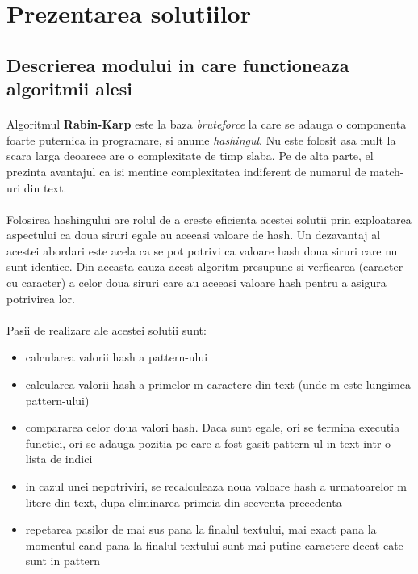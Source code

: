 \documentclass[runningheads]{llncs}
\begin{document}
\section{Prezentarea solutiilor}
\subsection{Descrierea modului in care functioneaza algoritmii alesi}
\paragraph{} Algoritmul \textbf{Rabin-Karp} este la baza \textit{bruteforce} la care se adauga o componenta foarte puternica in programare, si anume \textit{hashingul}. Nu este folosit asa mult la scara larga deoarece are o complexitate de timp slaba. Pe de alta parte, el prezinta avantajul ca isi mentine complexitatea indiferent de numarul de match-uri din text.
\paragraph{} Folosirea hashingului are rolul de a creste eficienta acestei solutii prin exploatarea aspectului ca doua siruri egale au aceeasi valoare de hash. Un dezavantaj al acestei abordari este acela ca se pot potrivi ca valoare hash doua siruri care nu sunt identice. Din aceasta cauza acest algoritm presupune si verficarea (caracter cu caracter) a celor doua siruri care au aceeasi valoare hash pentru a asigura potrivirea lor.
\paragraph{} Pasii de realizare ale acestei solutii sunt: \\
\begin{itemize}
\item calcularea valorii hash a pattern-ului
\item calcularea valorii hash a primelor m caractere din text (unde m este lungimea pattern-ului)
\item compararea celor doua valori hash. Daca sunt egale, ori se termina executia functiei, ori se adauga pozitia pe care a fost gasit pattern-ul in text intr-o lista de indici
\item in cazul unei nepotriviri, se recalculeaza noua valoare hash a urmatoarelor m litere din text, dupa eliminarea primeia din secventa precedenta
\item repetarea pasilor de mai sus pana la finalul textului, mai exact pana la momentul cand pana la finalul textului sunt mai putine caractere decat cate sunt in pattern
\end{itemize}
\end{document}
